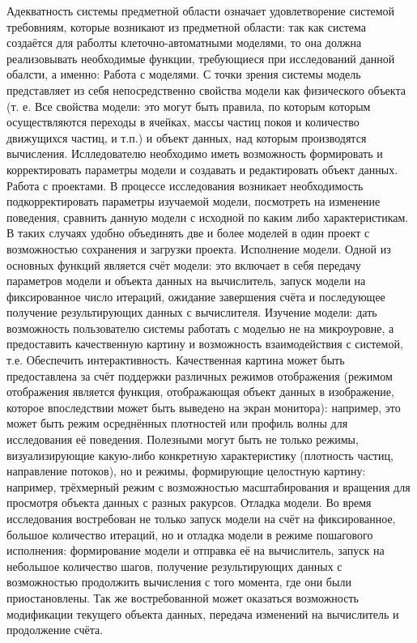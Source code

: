 \documentclass[a4paper,12pt]{extarticle}
\begin{document}
Адекватность системы предметной области означает удовлетворение системой требовниям, которые возникают из предметной области: так как система создаётся для раболты клеточно-автоматными моделями, то она должна реализовывать необходимые функции, требующиеся при исследований данной обалсти, а именно:
Работа с моделями. С точки зрения системы модель представляет из себя непосредственно свойства модели как физического объекта (т. е. Все свойства модели: это могут быть правила, по которым которым осуществляются переходы в ячейках, массы частиц покоя и количество движущихся частиц, и т.п.) и объект данных, над которым производятся вычисления. Ислледователю необходимо иметь возможность формировать и корректировать параметры модели и создавать и редактировать объект данных.
Работа с проектами. В процессе исследования возникает необходимость подкорректировать параметры изучаемой модели, посмотреть на изменение поведения, сравнить данную модели с исходной по каким либо характеристикам. В таких случаях удобно объединять две и более моделей в один проект с возможностью сохранения и загрузки проекта.
Исполнение модели. Одной из основных функций является счёт модели: это включает в себя передачу параметров модели и объекта данных на вычислитель, запуск модели на фиксированное число итераций, ожидание завершения счёта и последующее получение результирующих данных с вычислителя. 
Изучение модели: дать возможность пользователю системы работать с моделью не на микроуровне, а предоставить качественную картину и возможность взаимодействия с системой, т.е. Обеспечить интерактивность. Качественная картина может быть предоставлена за счёт поддержки различных режимов отображения (режимом отображения является функция, отображающая объект данных в изображение, которое впоследствии может быть выведено на экран монитора): например, это может быть режим осреднённых плотностей или профиль волны для исследования её поведения. Полезными могут быть не только режимы, визуализирующие какую-либо конкретную характеристику (плотность частиц, направление потоков), но и режимы, формирующие целостную картину: например, трёхмерный режим с возможностью масштабирования и вращения для просмотря объекта данных с разных ракурсов.
Отладка модели. Во время исследования востребован не только запуск модели на счёт на фиксированное, большое количество итераций, но и отладка модели в режиме пошагового исполнения: формирование модели и отправка её на вычислитель, запуск на небольшое количество шагов, получение результирующих данных с возможностью продолжить вычисления с того момента, где они были приостановлены. Так же востребованной может оказаться возможность модификации текущего объекта данных, передача изменений на вычислитель и продолжение счёта.
\end{document}
